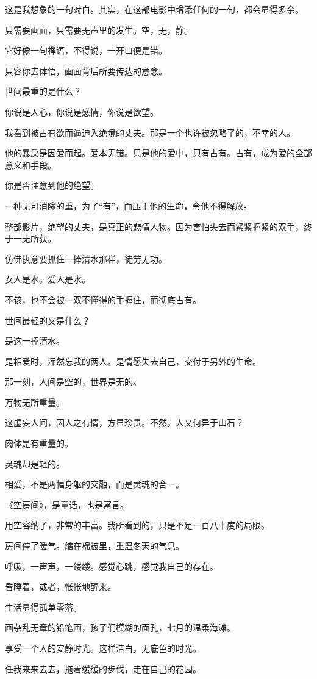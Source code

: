 		这是我想象的一句对白。其实，在这部电影中增添任何的一句，都会显得多余。\par
		只需要画面，只需要无声里的发生。空，无，静。\par
		它好像一句禅语，不得说，一开口便是错。\par
		只容你去体悟，画面背后所要传达的意念。

		世间最重的是什么？\par
		你说是人心，你说是感情，你说是欲望。\par
		我看到被占有欲而逼迫入绝境的丈夫。那是一个也许被忽略了的，不幸的人。\par
		他的暴戾是因爱而起。爱本无错。只是他的爱中，只有占有。占有，成为爱的全部意义和手段。\par
		你是否注意到他的绝望。\par
		一种无可消除的重，为了“有”，而压于他的生命，令他不得解放。\par
		整部影片，绝望的丈夫，是真正的悲情人物。因为害怕失去而紧紧握紧的双手，终于一无所获。\par
		仿佛执意要抓住一捧清水那样，徒劳无功。\par
		女人是水。爱人是水。\par
		不该，也不会被一双不懂得的手握住，而彻底占有。\par
		世间最轻的又是什么？\par
		是这一捧清水。\par
		是相爱时，浑然忘我的两人。是情愿失去自己，交付于另外的生命。\par
		那一刻，人间是空的，世界是无的。\par
		万物无所重量。\par
		这虚妄人间，因人之有情，方显珍贵。不然，人又何异于山石？\par
		肉体是有重量的。\par
		灵魂却是轻的。\par
		相爱，不是两幅身躯的交融，而是灵魂的合一。

		《空房间》，是童话，也是寓言。\par
		用空容纳了，非常的丰富。我所看到的，只是不足一百八十度的局限。

	\endwriting



		房间停了暖气。缩在棉被里，重温冬天的气息。\par
		呼吸，一声声，一缕缕。感觉心跳，感觉我自己的存在。

		昏睡着，或者，怅怅地醒来。\par
		生活显得孤单零落。\par
		画杂乱无章的铅笔画，孩子们模糊的面孔，七月的温柔海滩。\par
		享受一个人的安静时光。这样洁白，无底色的时光。\par
		任我来来去去，拖着缓缓的步伐，走在自己的花园。

